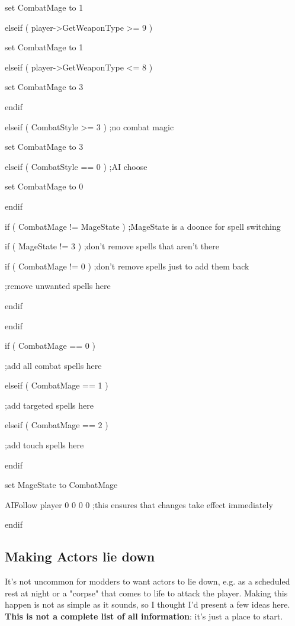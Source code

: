 \documentclass[
]{article}
\begin{document}
set CombatMage to 1

elseif ( player-\textgreater GetWeaponType \textgreater= 9 )

set CombatMage to 1

elseif ( player-\textgreater GetWeaponType \textless= 8 )

set CombatMage to 3

endif

elseif ( CombatStyle \textgreater= 3 ) ;no combat magic

set CombatMage to 3

elseif ( CombatStyle == 0 ) ;AI choose

set CombatMage to 0

endif

if ( CombatMage != MageState ) ;MageState is a doonce for spell
switching

if ( MageState != 3 ) ;don't remove spells that aren't there

if ( CombatMage != 0 ) ;don't remove spells just to add them back

;remove unwanted spells here

endif

endif

if ( CombatMage == 0 )

;add all combat spells here

elseif ( CombatMage == 1 )

;add targeted spells here

elseif ( CombatMage == 2 )

;add touch spells here

endif

set MageState to CombatMage

AIFollow player 0 0 0 0 ;this ensures that changes take effect
immediately

endif

\hypertarget{making-actors-lie-down}{%
\subsection{Making Actors lie down}\label{making-actors-lie-down}}

It's not uncommon for modders to want actors to lie down, e.g. as a
scheduled rest at night or a "corpse" that comes to life to attack the
player. Making this happen is not as simple as it sounds, so I thought
I'd present a few ideas here. \textbf{This is not a complete list of all
information}: it's just a place to start.
\end{document}

